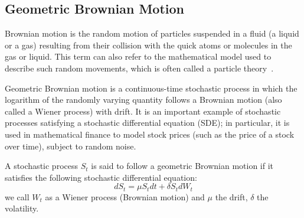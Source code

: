 


\subsection{Geometric Brownian Motion}
Brownian motion is the random motion of particles suspended in a fluid (a liquid or a gas) resulting from their collision with the quick atoms or molecules in the gas or liquid. This term 
can also refer to the mathematical model used to describe such random movements, which is often called a particle theory~\cite{morters2010brownian}.

Geometric Brownian motion is a continuous-time stochastic process in which the logarithm of the randomly varying quantity follows a Brownian motion (also called a Wiener process) with drift. It is an important example of stochastic processes satisfying a stochastic differential equation (SDE); in particular, it is used in mathematical finance to model stock prices (such as the price of a stock over time), subject to random noise.

A stochastic process $S_t$ is said to follow a geometric Brownian motion if it satisfies the following stochastic differential equation:
$$d S_t = \mu S_t dt + \delta S_t dW_t $$
we call $W_t$ as a Wiener process (Brownian motion) and $\mu$ the drift, $\delta$ the volatility.

